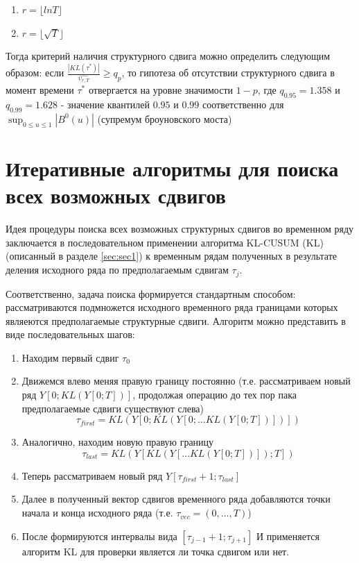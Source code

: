 \documentclass[a4paper,14pt,russian]{extarticle}
\begin{document}
	\begin{enumerate}
		\item $r = \lfloor lnT \rfloor$
		\item $r = \lfloor \sqrt{T} \rfloor$
	\end{enumerate}
	Тогда критерий наличия структурного сдвига можно определить следующим образом: если $\frac{|KL(\tau^*)|}{\hat{\upsilon_{r,T}}} \geq q_p$, то гипотеза об отсутствии структурного сдвига в момент времени $\tau^*$ отвергается на уровне значимости $1 - p$, где $q_{0.95} = 1.358$ и $q_{0.99} = 1.628$ - значение квантилей $0.95$ и $0.99$ соответственно для $\sup_{0 \leq u \leq 1}|B^0(u)|$ (супремум броуновского моста)
	
	
	\clearpage
	\section{\label{sec:sec2}Итеративные алгоритмы для поиска всех возможных сдвигов}
	Идея процедуры поиска всех возможных структурных сдвигов во временном ряду заключается в последовательном применении алгоритма KL-CUSUM (KL) (описанный в разделе \ref{sec:sec1}) к временным рядам полученных в результате деления исходного ряда по предполагаемым сдвигам $\tau_j$.
	\par
	Соответственно, задача поиска формируется стандартным способом: рассматриваются подмножется исходного временного ряда границами которых являеются предполагаемые структурные сдвиги. Алгоритм можно представить в виде последовательных шагов:
	\begin{enumerate}
		\item Находим первый сдвиг $\tau_0$ 
		\item Движемся влево меняя правую границу постоянно (т.е. рассматриваем новый ряд $Y\left[0; KL(Y\left[0; T\right])\right]$, продолжая операцию до тех пор пака предполагаемые сдвиги существуют слева)
		\begin{equation}
			\tau_{first} = KL(Y\left[0; KL(Y\left[0; \dots KL(Y\left[0; T\right]) \right] )   \right])
		\end{equation}
		\item Аналогично, находим новую правую границу
			\begin{equation}
				\tau_{last} = KL(Y\left[KL(Y\left[ \dots KL(Y\left[0; T\right])\right]); T\right])
			\end{equation}
		\item Теперь рассматриваем новый ряд $Y\left[\tau_{first} + 1; \tau_{last}\right]$
		\item Далее в полученный вектор сдвигов временного ряда добавляются точки начала и конца исходного ряда (т.е. $\tau_{vec} = \left( 0, \dots, T \right)$)
		\item После формируются интервалы вида $\left[ \tau_{j - 1} + 1; \tau_{j + 1} \right]$ И применяется алгоритм KL для проверки является ли точка сдвигом или нет.
	\end{enumerate}
\end{document}
